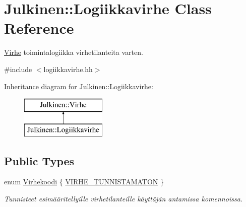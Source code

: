\hypertarget{class_julkinen_1_1_logiikkavirhe}{}\section{Julkinen\+:\+:Logiikkavirhe Class Reference}
\label{class_julkinen_1_1_logiikkavirhe}


\hyperlink{class_julkinen_1_1_virhe}{Virhe} toimintalogiikka virhetilanteita varten.  




{\ttfamily \#include $<$logiikkavirhe.\+hh$>$}

Inheritance diagram for Julkinen\+:\+:Logiikkavirhe\+:\begin{figure}[H]
\begin{center}
\leavevmode
\includegraphics[height=2.000000cm]{class_julkinen_1_1_logiikkavirhe}
\end{center}
\end{figure}
\subsection*{Public Types}
\begin{DoxyCompactItemize}
\item 
enum \hyperlink{class_julkinen_1_1_logiikkavirhe_afbf716c9c72439df3d8638576942d14d}{Virhekoodi} \{ \hyperlink{class_julkinen_1_1_logiikkavirhe_afbf716c9c72439df3d8638576942d14da327478ab895f92a6e547db21b050ab8f}{V\+I\+R\+H\+E\+\_\+\+T\+U\+N\+N\+I\+S\+T\+A\+M\+A\+T\+O\+N}
 \}\begin{DoxyCompactList}\small\item\em Tunnisteet esimääritellyille virhetilanteille käyttäjän antamissa komennoissa. \end{DoxyCompactList}
\end{DoxyCompactItemize}
